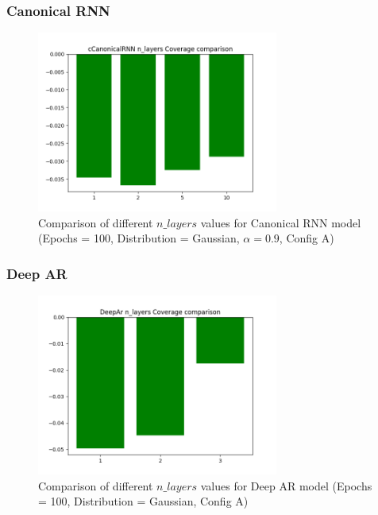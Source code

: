 \subsubsection{Canonical RNN} \label{comp2_canonicalrnn}

\begin{figure}[H]
    \centering
    \includegraphics[width=300px]{plots/hist/a/cCanonicalRNN/n_layers/Coverage.png}
    \caption{Comparison of different $n\_layers$ values for Canonical RNN model (Epochs = 100, Distribution = Gaussian, $\alpha = 0.9$, Config A)}
    \label{fig:comp2_canonicalrnn}
\end{figure}



\subsubsection{Deep AR} \label{comp2_deepar}

\begin{figure}[H]
    \centering
    \includegraphics[width=300px]{plots/hist/a/DeepAr/n_layers/Coverage.png}
    \caption{Comparison of different $n\_layers$ values for Deep AR model (Epochs = 100, Distribution = Gaussian, Config A)}
    \label{fig:comp2_deepar_n_layers}
\end{figure}

